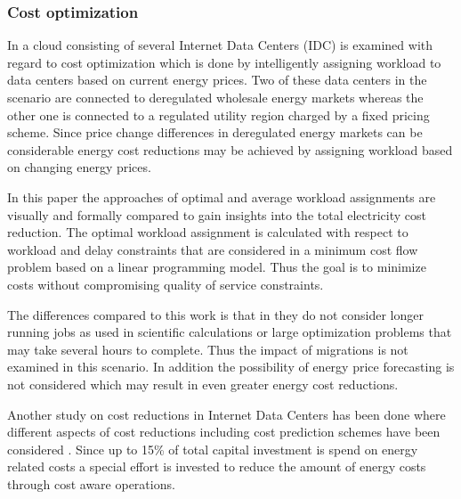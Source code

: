\subsubsection{Cost optimization}

In \cite{rao2010minimizing} a cloud consisting of several Internet Data Centers (IDC) is examined with regard to cost optimization which is done by intelligently assigning workload to data centers based on current energy prices. Two of these data centers in the scenario are connected to deregulated wholesale energy markets whereas the other one is connected to a regulated utility region charged by a fixed pricing scheme. Since price change differences in deregulated energy markets can be considerable energy cost reductions may be achieved by assigning workload based on changing energy prices.  %

In this paper the approaches of optimal and average workload assignments are visually and formally compared to gain insights into the total electricity cost reduction. The optimal workload assignment is calculated with respect to workload and delay constraints that are considered in a minimum cost flow problem based on a linear programming model. Thus the goal is to minimize costs without compromising quality of service constraints. 

The differences compared to this work is that in \cite{rao2010minimizing} they do not consider longer running jobs as used in scientific calculations or large optimization problems that may take several hours to complete. Thus the impact of migrations is not examined in this scenario. In addition the possibility of energy price forecasting is not considered which may result in even greater energy cost reductions. 

Another study on cost reductions in Internet Data Centers has been done where different aspects of cost reductions including cost prediction schemes have been considered \cite{de2013study}. Since up to 15\% of total capital investment is spend on energy related costs 
a special effort is invested to reduce the amount of energy costs through cost aware operations. %

